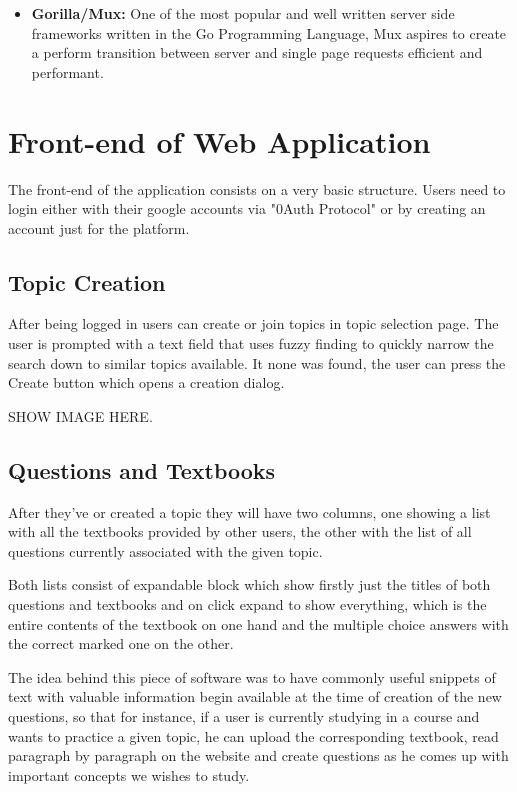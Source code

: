 \begin{itemize}
\item \textbf{Gorilla/Mux:} One of the most popular and well written server side 
    frameworks written in the Go Programming Language, Mux aspires to create a perform
    transition between server and single page requests efficient and performant.

\end{itemize}


\section{Front-end of Web Application}
The front-end of the application consists on a very basic structure. Users need to login
either with their google accounts via "0Auth Protocol" or by creating an account just 
for the platform.

\subsection{Topic Creation}
After being logged in users can create 
or join topics in topic selection page. The user is prompted with a text field that 
uses fuzzy finding to quickly narrow the search down to similar topics available.
It none was found, the user can press the Create button which opens a creation dialog.

SHOW IMAGE HERE.

\subsection{Questions and Textbooks}
After they've or created a topic they will have two columns, one showing a list with
all the textbooks provided by other users, the other with the list of all questions
currently associated with the given topic.

Both lists consist of expandable block which show firstly just the titles of both
questions and textbooks and on click expand to show everything, which is the entire
contents of the textbook on one hand and the multiple choice answers with the 
correct marked one on the other.

The idea behind this piece of software was to have commonly useful snippets of text
with valuable information begin available at the time of creation of the new questions,
so that for instance, if a user is currently studying in a course and wants to 
practice a given topic, he can upload the corresponding textbook, read paragraph by 
paragraph on the website and create questions as he comes up with important concepts
we wishes to study.

